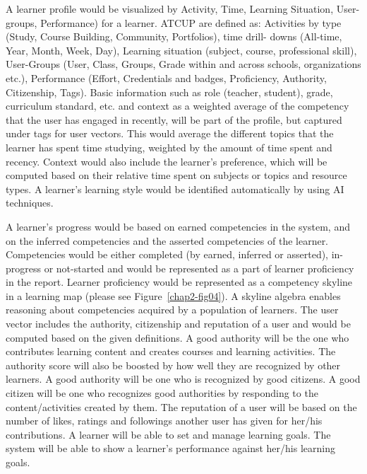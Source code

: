\begin{multicols}{2}
A learner profile would be visualized by Activity, Time, Learning Situation, User-groups, Performance) for a learner. ATCUP are defined as: Activities by type (Study, Course Building, Community, Portfolios), time drill- downs (All-time, Year, Month, Week, Day), Learning situation (subject, course, professional skill), User-Groups (User, Class, Groups, Grade within and across schools, organizations etc.), Performance (Effort, Credentials and badges, Proficiency, Authority, Citizenship, Tags). Basic information such as role (teacher, student), grade, curriculum standard, etc. and context as a weighted average of the competency that the user has engaged in recently, will be part of the profile, but captured under tags for user vectors. This would average the different topics that the learner has spent time studying, weighted by the amount of time spent and recency. Context would also include the learner’s preference, which will be computed based on their relative time spent on subjects or topics and resource types. A learner’s learning style would be identified automatically by using AI techniques.

A learner’s progress would be based on earned competencies in the system, and on the inferred competencies and the asserted competencies of the learner. Competencies would be either completed (by earned, inferred or asserted), in-progress or not-started and would be represented as a part of learner proficiency in the report. Learner proficiency would be represented as a competency skyline in a learning map (please see Figure~\ref{chap2-fig04}). A skyline algebra enables reasoning about competencies acquired by a population of learners. The user vector includes the authority, citizenship and reputation of a user and would be computed based on the given definitions. A good authority will be the one who contributes learning content and creates courses and learning activities. The authority score will also be boosted by how well they are recognized by other learners. A good authority will be one who is recognized by good citizens. A good citizen will be one who recognizes good authorities by responding to the content/activities created by them. The reputation of a user will be based on the number of likes, ratings and followings another user has given for her/his contributions. A learner will be able to set and manage learning goals. The system will be able to show a learner’s performance against her/his learning goals.


\end{multicols}
